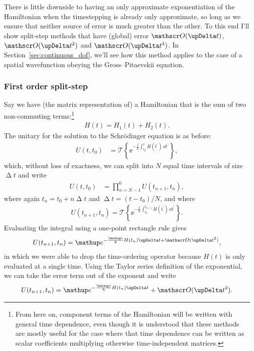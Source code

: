 There is little downside to having an only approximate exponentiation of the Hamiltonian when the timestepping is already only approximate, so long as we ensure that neither source of error is much greater than the other. To this end I'll show split-step methods that have (global) error $\Ord{\upDelta t}$, $\Ord{\upDelta t^2}$ and $\Ord{\upDelta t^4}$. In Section~\ref{sec:continuous_dof}, we'll see how this method applies to the case of a spatial wavefunction obeying the Gross--Pitaevskii equation.

\subsubsection{First order split-step}
Say we have (the matrix representation of) a Hamiltonian that is the sum of two non-commuting terms:\footnote{From here on, component terms of the Hamiltonian will be written with general time dependence, even though it is understood that these methods are mostly useful for the case where that time dependence can be written as scalar coefficients multiplying otherwise time-independent matrices.}
\begin{align}
H(t) = H_1(t) + H_2(t).
\end{align}
The unitary for the solution to the Schr\"odinger equation is as before:
\begin{align}
U(t, t_0) &= \mathcal{T}\left\{\ee^{-\frac \ii \hbar \int_{t_0}^t H(t^\prime)\,\dd t^\prime}\right\},
\end{align}
which, without loss of exactness, we can split into $N$ equal time intervals of size $\upDelta t$ and write
\begin{align}
U(t, t_0) &= \prod_{n=N-1}^0 U(t_{n+1}, t_n),
\end{align}
where again $t_n = t_0 + n\upDelta t$ and $\upDelta t = (t - t_0)/N$, and where
\begin{align}\label{eq:U_singlestep_exact}
U(t_{n+1}, t_n) = \mathcal{T}\left\{\ee^{-\frac \ii \hbar \int_{t_n}^{t_{n+1}} H(t^\prime)\,\dd t^\prime}\right\}.
\end{align}
Evaluating the integral using a one-point rectangle rule gives
\begin{align}
U(t_{n+1}, t_n) = \ee^{-\frac \ii \hbar H(t_n)\upDelta t + \Ord{\upDelta t^2}},
\end{align}
in which we were able to drop the time-ordering operator because $H(t)$ is only evaluated at a single time. Using the Taylor series definition of the exponential, we can take the error term out of the exponent and write
\begin{align}\label{eq:integration_error}
U(t_{n+1}, t_n) = \ee^{-\frac \ii \hbar H(t_n)\upDelta t} + \Ord{\upDelta t^2}.
\end{align}

